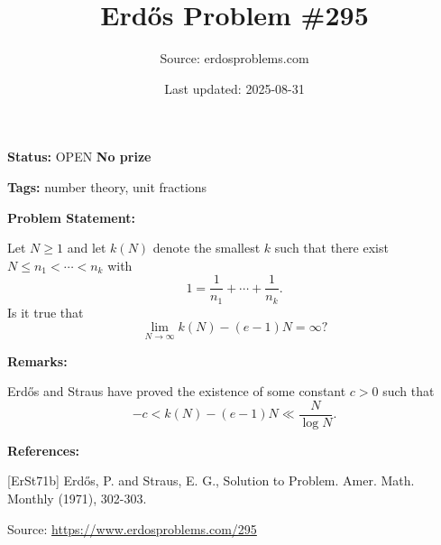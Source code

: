 \documentclass{article}
\title{Erd\H{o}s Problem \#295}
\date{Last updated: 2025-08-31}
\author{Source: erdosproblems.com}
\begin{document}
\maketitle

\noindent\textbf{Status:} OPEN \quad \textbf{No prize}

\noindent\textbf{Tags:} number theory, unit fractions

\medskip
\noindent\textbf{Problem Statement:}

Let $N\geq 1$ and let $k(N)$ denote the smallest $k$ such that there exist $N\leq n_1<\cdots <n_k$ with\[1=\frac{1}{n_1}+\cdots+\frac{1}{n_k}.\]Is it true that\[\lim_{N\to \infty} k(N)-(e-1)N=\infty?\]

\bigskip
\noindent\textbf{Remarks:}

Erd\H{o}s and Straus \cite{ErSt71b} have proved the existence of some constant $c>0$ such that\[-c < k(N)-(e-1)N \ll \frac{N}{\log N}.\]

\bigskip
\noindent\textbf{References:}

[ErSt71b] Erd\H{o}s, P. and Straus, E. G., Solution to Problem. Amer. Math. Monthly (1971), 302-303.

\bigskip
\noindent\small{Source: \url{https://www.erdosproblems.com/295}}
\end{document}
